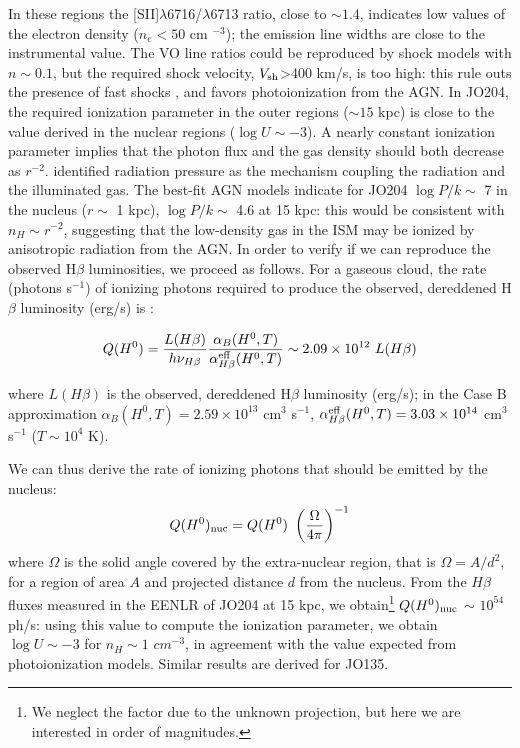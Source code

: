 \documentclass[fleqn,usenatbib]{mnras}
\begin{document}
In these regions the [SII]$\lambda$6716/$\lambda$6713 ratio, close to $\sim 1.4$, indicates low values of the electron density ($n_e < 50$ cm $^{-3}$); the emission line widths are close to the instrumental value. The VO line ratios could be reproduced by shock models with $n \sim 0.1$, but the required shock velocity, $V_{\rm sh}$>400 km/s, is too high: this rule outs  the presence of fast shocks \citep[see also][]{2009ApJ...690..953F}, and favors photoionization from the AGN. In JO204, the required ionization parameter in the outer regions ($\sim 15$ kpc) is close to the value derived in the nuclear regions ($\log U \sim -3$). A nearly constant ionization parameter  implies that the photon flux and the gas density should both decrease  as $r^{-2}$. \citet{2018ApJ...856...89T} identified radiation pressure as the mechanism coupling the radiation and the illuminated gas. The best-fit AGN models indicate for JO204 $\log P/k \sim$ 7 in the nucleus ($r \sim$ 1 kpc),   $\log P/k \sim$ 4.6 at 15 kpc: this would be consistent with $n_H \sim r^{-2}$, suggesting that the low-density gas in the ISM may be ionized by anisotropic radiation from the AGN.    
In order to verify if we can reproduce the observed H$\beta$ luminosities, we proceed as follows. For a gaseous cloud, the rate (photons s$^{-1}$) of ionizing photons required to produce  the observed, dereddened H$\beta$ luminosity (erg/s) is \citep{2006agna.book.....O}:

\begin{equation}
Q(H^0) = \frac{L(H\beta)}{h \nu_{H\beta}} \frac{\alpha_B(H^0,T)}{\alpha^{\rm eff}_{H\beta}(H^0,T)} \sim 2.09 \times 10^{12} \ L(H\beta)
\end{equation}

where $L(H\beta)$ is the observed, dereddened H$\beta$ luminosity (erg/s); in the Case B approximation  $\alpha_B(H^0,T)= 2.59 \times 10^{13}$ cm$^3$ s$^{-1}$,  $\alpha^{\rm eff}_{H\beta}(H^0,T) = 3.03 \times 10^{14}$ cm$^3$ s$^{-1}$ ($T\sim 10^4$ K). 

We can thus derive the rate of ionizing photons that should be emitted by the nucleus:
\begin{equation}
Q(H^0)_{\rm nuc}  = Q(H^0) \ \left(\frac{\Omega}{4\pi}\right)^{-1}
\end{equation}
where $\Omega$ is the solid angle covered by the extra-nuclear region, that is $\Omega = A/d^2$, for a region of area $A$ and  projected distance $d$ from the nucleus. From the $H\beta$ fluxes measured in the EENLR of JO204 at 15 kpc, we obtain\footnote{We neglect the factor due to the unknown projection, but here we are interested in order of magnitudes.} $Q(H^0)_{\rm nuc}$ $\sim$ $10^{54}$ ph/s: using this value to compute the ionization parameter, we obtain $\log U \sim -3$ for $n_H \sim 1$ $cm^{-3}$, in agreement with the value expected from photoionization models. Similar results are derived for JO135.
\end{document}
